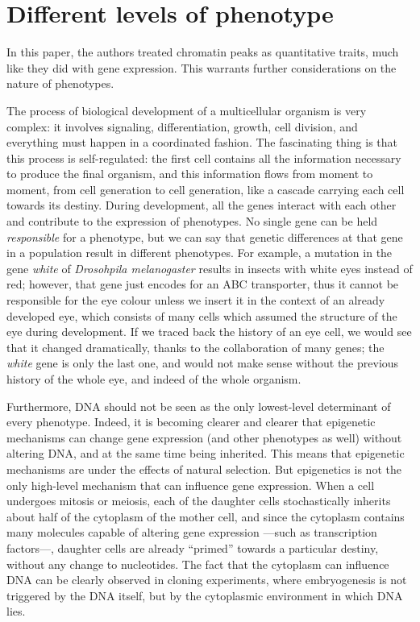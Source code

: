 \documentclass[../main.tex]{subfiles}
\begin{document}
\section{Different levels of phenotype}

In this paper, the authors treated chromatin peaks as quantitative 
traits, much like they did with gene expression. This warrants further 
considerations on the nature of phenotypes.

The process of biological development of a multicellular organism is 
very complex: it involves signaling, differentiation, growth, cell 
division, and everything must happen in a coordinated fashion. The 
fascinating thing is that this process is self-regulated: the first cell 
contains all the information necessary to produce the final organism, 
and this information flows from moment to moment, from cell generation 
to cell generation, like a cascade carrying each cell towards its 
destiny. During development, all the genes interact with each other and 
contribute to the expression of phenotypes. No single gene can be held 
\textit{responsible} for a phenotype, but we can say that genetic 
differences at that gene in a population result in different 
phenotypes\autocite{Griffiths2007}. For example, a mutation in the gene 
\textit{white} of \textit{Drosohpila melanogaster} results in insects 
with white eyes instead of red; however, that gene just encodes for an 
ABC transporter\autocite{Mackenzie1999a}, thus it cannot be responsible 
for the eye colour unless we insert it in the context of an already 
developed eye, which consists of many cells which assumed the structure 
of the eye during development. If we traced back the history of an eye 
cell, we would see that it changed dramatically, thanks to the 
collaboration of many genes; the \textit{white} gene is only the last 
one, and would not make sense without the previous history of the whole 
eye, and indeed of the whole organism.

Furthermore, DNA should not be seen as the only lowest-level determinant 
of every phenotype. Indeed, it is becoming clearer and clearer that 
epigenetic mechanisms can change gene expression (and other phenotypes 
as well) without altering DNA, and at the same time being inherited. 
This means that epigenetic mechanisms are under the effects of natural 
selection\autocite{Hunter2009a}. But epigenetics is not the only 
high-level mechanism that can influence gene expression. When a cell 
undergoes mitosis or meiosis, each of the daughter cells stochastically 
inherits about half of the cytoplasm of the mother cell, and since the 
cytoplasm contains many molecules capable of altering gene expression 
---such as transcription factors---, daughter cells are already 
\enquote{primed} towards a particular destiny, without any change to 
nucleotides. The fact that the cytoplasm can influence DNA can be 
clearly observed in cloning experiments, where embryogenesis is not 
triggered by the DNA itself, but by the cytoplasmic environment in which 
DNA lies.
\end{document}
